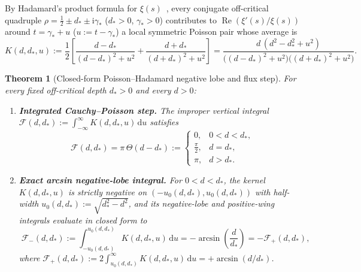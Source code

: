 \documentclass[11pt,reqno]{amsart}
\theoremstyle{plain}
\newtheorem{theorem}{Theorem}[section]
\theoremstyle{definition}
\theoremstyle{remark}
\numberwithin{equation}{section}
\newcommand{\dd}{\,\mathrm{d}}
\newcommand{\ii}{\mathrm{i}}
\DeclareMathOperator{\Reop}{Re}
\begin{document}
By Hadamard's product formula for $\xi(s)$~\cite{titchmarsh1986,lagarias1999}, every conjugate off-critical quadruple $\rho = \frac{1}{2} \pm d_* \pm \ii\gamma_*$ ($d_* > 0$, $\gamma_* > 0$) contributes to $\Reop(\xi'(s)/\xi(s))$ around $t = \gamma_* + u$ ($u := t - \gamma_*$) a local symmetric Poisson pair whose average is
\begin{equation}\label{eq:poisson_pair_kernel}
K(d, d_*, u) := \frac{1}{2}\left[\frac{d - d_*}{(d - d_*)^2 + u^2} + \frac{d + d_*}{(d + d_*)^2 + u^2}\right] = \frac{d\,(d^2 - d_*^2 + u^2)}{\bigl((d - d_*)^2 + u^2\bigr)\bigl((d + d_*)^2 + u^2\bigr)}.
\end{equation}

\begin{theorem}[Closed-form Poisson--Hadamard negative lobe and flux step]\label{thm:hadamard_flux}
For every fixed off-critical depth $d_* > 0$ and every $d > 0$:
\begin{enumerate}[label=\textup{(\roman*)},leftmargin=2.2em]
\item \textbf{Integrated Cauchy--Poisson step.} The improper vertical integral $\mathcal{F}(d, d_*) := \int_{-\infty}^{\infty} K(d, d_*, u)\dd u$ satisfies
\begin{equation}\label{eq:flux_step}
\mathcal{F}(d, d_*) = \pi\,\Theta(d - d_*) := \begin{cases} 0, & 0 < d < d_*, \\ \frac{\pi}{2}, & d = d_*, \\ \pi, & d > d_*. \end{cases}
\end{equation}
\item \textbf{Exact arcsin negative-lobe integral.} For $0 < d < d_*$, the kernel $K(d, d_*, u)$ is strictly negative on $(-u_0(d, d_*), u_0(d, d_*))$ with half-width $u_0(d, d_*) := \sqrt{d_*^2 - d^2}$, and its negative-lobe and positive-wing integrals evaluate in closed form to
\begin{equation}\label{eq:boxed_arcsin}
\boxed{\;\mathcal{F}_-(d, d_*) := \int_{-u_0(d, d_*)}^{u_0(d, d_*)} K(d, d_*, u)\dd u = -\arcsin\!\left(\frac{d}{d_*}\right) = -\mathcal{F}_+(d, d_*),\;}
\end{equation}
where $\mathcal{F}_+(d, d_*) := 2\int_{u_0(d, d_*)}^{\infty} K(d, d_*, u)\dd u = +\arcsin(d/d_*)$.
\end{enumerate}
\end{theorem}
\end{document}

